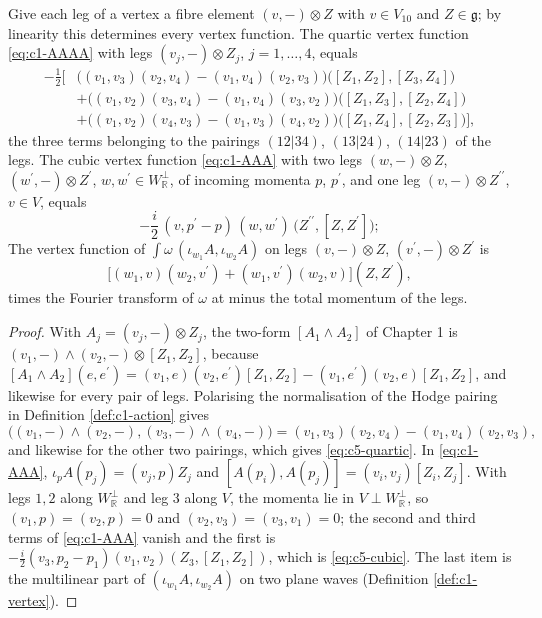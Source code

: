 \begin{lemma}
\label{lem:c5-vertices}
Give each leg of a vertex a fibre element $(v,-)\otimes Z$ with $v\in V_{10}$ and $Z\in\mathfrak g$; by linearity this determines every vertex function. The quartic vertex function \eqref{eq:c1-AAAA} with legs $(v_j,-)\otimes Z_j$, $j=1,\dots,4$, equals
\begin{equation}
\begin{aligned}
-\frac12\Big[&\big((v_1,v_3)(v_2,v_4)-(v_1,v_4)(v_2,v_3)\big)\big([Z_1,Z_2],[Z_3,Z_4]\big)\\
&+\big((v_1,v_2)(v_3,v_4)-(v_1,v_4)(v_3,v_2)\big)\big([Z_1,Z_3],[Z_2,Z_4]\big)\\
&+\big((v_1,v_2)(v_4,v_3)-(v_1,v_3)(v_4,v_2)\big)\big([Z_1,Z_4],[Z_2,Z_3]\big)\Big],
\end{aligned}
\label{eq:c5-quartic}
\end{equation}
the three terms belonging to the pairings $(12|34)$, $(13|24)$, $(14|23)$ of the legs. The cubic vertex function \eqref{eq:c1-AAA} with two legs $(w,-)\otimes Z$, $(w^{\prime},-)\otimes Z^{\prime}$, $w,w^{\prime}\in W_{\mathbb R}^\perp$, of incoming momenta $p$, $p^{\prime}$, and one leg $(v,-)\otimes Z^{\prime\prime}$, $v\in V$, equals
\begin{equation}
-\frac i2\,(v,p^{\prime}-p)\,(w,w^{\prime})\,\big(Z^{\prime\prime},[Z,Z^{\prime}]\big);
\label{eq:c5-cubic}
\end{equation}
The vertex function of $\int\omega\,(\iota_{w_1}A,\iota_{w_2}A)$ on legs $(v,-)\otimes Z$, $(v^{\prime},-)\otimes Z^{\prime}$ is
\[
\big[(w_1,v)(w_2,v^{\prime})+(w_1,v^{\prime})(w_2,v)\big](Z,Z^{\prime}),
\]
times the Fourier transform of $\omega$ at minus the total momentum of the legs.
\end{lemma}

\begin{proof}
With $A_j=(v_j,-)\otimes Z_j$, the two-form $[A_1\wedge A_2]$ of Chapter 1 is $(v_1,-)\wedge(v_2,-)\otimes[Z_1,Z_2]$, because $[A_1\wedge A_2](e,e^{\prime})=(v_1,e)(v_2,e^{\prime})[Z_1,Z_2]-(v_1,e^{\prime})(v_2,e)[Z_1,Z_2]$, and likewise for every pair of legs. Polarising the normalisation of the Hodge pairing in Definition \ref{def:c1-action} gives
\[
\big((v_1,-)\wedge(v_2,-),(v_3,-)\wedge(v_4,-)\big)=(v_1,v_3)(v_2,v_4)-(v_1,v_4)(v_2,v_3),
\]
and likewise for the other two pairings, which gives \eqref{eq:c5-quartic}. In \eqref{eq:c1-AAA}, $\iota_pA(p_j)=(v_j,p)Z_j$ and $[A(p_i),A(p_j)]=(v_i,v_j)[Z_i,Z_j]$. With legs $1,2$ along $W_{\mathbb R}^\perp$ and leg $3$ along $V$, the momenta lie in $V\perp W_{\mathbb R}^\perp$, so $(v_1,p)=(v_2,p)=0$ and $(v_2,v_3)=(v_3,v_1)=0$; the second and third terms of \eqref{eq:c1-AAA} vanish and the first is $-\tfrac i2(v_3,p_2-p_1)(v_1,v_2)(Z_3,[Z_1,Z_2])$, which is \eqref{eq:c5-cubic}. The last item is the multilinear part of $(\iota_{w_1}A,\iota_{w_2}A)$ on two plane waves (Definition \ref{def:c1-vertex}).
\end{proof}

